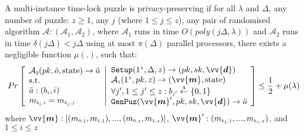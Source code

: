 \begin{definition}\label{Def::Solution-Privacy} A multi-instance time-lock puzzle  is privacy-preserving  if for all $\lambda$ and  $\Delta$,  any number of puzzle: $z\geq1$, any $j$ (where $1\leq j \leq z$), any pair of randomised algorithm $\mathcal{A} : (\mathcal{A}_{\scriptscriptstyle 1},\mathcal{A}_{\scriptscriptstyle 2})$, where $\mathcal{A}_{\scriptscriptstyle 1}$ runs in  time $O(poly(j\Delta,\lambda))$ and $\mathcal{A}_{\scriptscriptstyle 2}$ runs in  time $\delta(j\Delta)<j\Delta$ using at most $\pi(\Delta)$ parallel processors, there exists a negligible function $\mu(.)$, such that: 
\small{
$$ Pr\left[  \begin{array}{l} 
 \mathcal{A}_{\scriptscriptstyle 2}(pk,\ddot{o},\text{state})\rightarrow \ddot{a}\\
 \text{s.t.}\\
\ddot{a}:(b_{\scriptscriptstyle i},i)\\
  m_{\scriptscriptstyle b_{\scriptscriptstyle i},i}=m_{\scriptscriptstyle b_{\scriptscriptstyle j},j} 
  \end{array}
 \middle |
    \begin{array}{l}
\mathtt{Setup}(1^{\scriptscriptstyle\lambda},\Delta,z)\rightarrow (pk,sk,\vv{\bm{d}})\\
\mathcal{A}_{\scriptscriptstyle 1}(1^{\scriptscriptstyle\lambda},pk,z)\rightarrow (\vv{\bm{m}},\text{state})\\

\forall j', 1\leq j' \leq z: b_{\scriptscriptstyle j'}\stackrel{\scriptscriptstyle\$}\leftarrow \{0,1\}\\
\mathtt {GenPuz}(\vv{\bm{m}}', pk, sk,\vv{\bm{d}})\rightarrow \ddot{o}\\
\end{array}    \right]\leq \frac{1}{2}+\mu(\lambda)$$
}
where  $\vv{\bm{m}}: [(m_{\scriptscriptstyle 0,1},m_{\scriptscriptstyle 1,1}),...,(m_{\scriptscriptstyle 0,z},m_{\scriptscriptstyle 1,z})]$, $\vv{\bm{m}}':(m_{\scriptscriptstyle b_{\scriptscriptstyle 1},\scriptscriptstyle 1},..., m_{\scriptscriptstyle b_{\scriptscriptstyle z},\scriptscriptstyle z})$,  and $1\leq i\leq z$
\end{definition}

